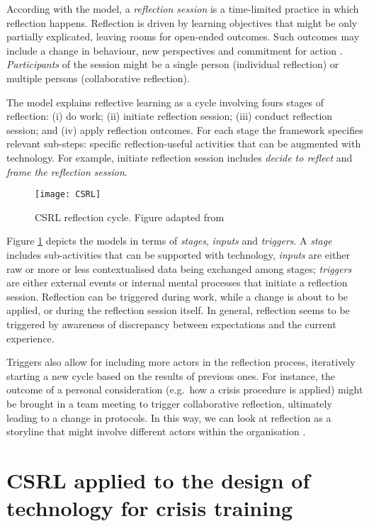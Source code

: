 According with the model, a \emph{reflection session} is a time-limited practice in which reflection happens. Reflection is driven by learning objectives that might be only partially explicated, leaving rooms for open-ended outcomes. Such outcomes may include a change in behaviour, new perspectives and commitment for action \autocite{boud1985reflection}. \emph{Participants} of the session might be a single person (individual reflection) or multiple persons (collaborative reflection).

The model explains reflective learning as a cycle involving fours stages of reflection: (i) do work; (ii) initiate reflection session; (iii) conduct reflection session; and (iv) apply reflection outcomes. For each stage the framework specifies relevant sub-steps: specific reflection-useful activities that can be augmented with technology. For example, initiate reflection session includes \emph{decide to reflect} and \emph{frame the reflection session}.
\begin{figure}
	[tbh] \centering 
	\texttt{[image: CSRL]} \caption{CSRL reflection cycle. Figure adapted from \protect\autocite{Krogstie:2013kf}} \label{fig:csrl-model} 
\end{figure}

Figure \ref{fig:csrl-model} depicts the models in terms of \emph{stages}, \emph{inputs} and \emph{triggers}. A \emph{stage} includes sub-activities that can be supported with technology, \emph{inputs} are either raw or more or less contextualised data being exchanged among stages; \emph{triggers} are either external events or internal mental processes that initiate a reflection session. Reflection can be triggered during work, while a change is about to be applied, or during the reflection session itself. In general, reflection seems to be triggered by awareness of discrepancy between expectations and the current experience.

Triggers also allow for including more actors in the reflection process, iteratively starting a new cycle based on the results of previous ones. For instance, the outcome of a personal consideration (e.g.~how a crisis procedure is applied) might be brought in a team meeting to trigger collaborative reflection, ultimately leading to a change in protocols. In this way, we can look at reflection as a storyline that might involve different actors within the organisation \autocite{PrPK13}.

\section{CSRL applied to the design of technology for crisis training}\label{csrl-applied-to-the-design-of-technology-for-crisis-training}

